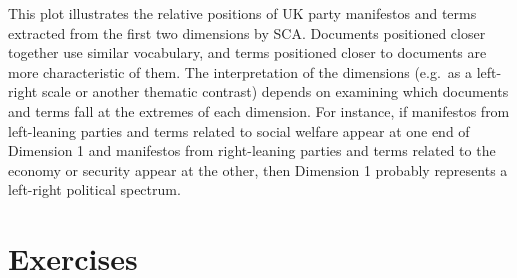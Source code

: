 \documentclass[
]{book}
\begin{document}
This plot illustrates the relative positions of UK party manifestos and terms extracted from the first two dimensions by SCA. Documents positioned closer together use similar vocabulary, and terms positioned closer to documents are more characteristic of them. The interpretation of the dimensions (e.g.~as a left-right scale or another thematic contrast) depends on examining which documents and terms fall at the extremes of each dimension. For instance, if manifestos from left-leaning parties and terms related to social welfare appear at one end of Dimension 1 and manifestos from right-leaning parties and terms related to the economy or security appear at the other, then Dimension 1 probably represents a left-right political spectrum.

\section{Exercises}\label{exercises-2}
\end{document}
